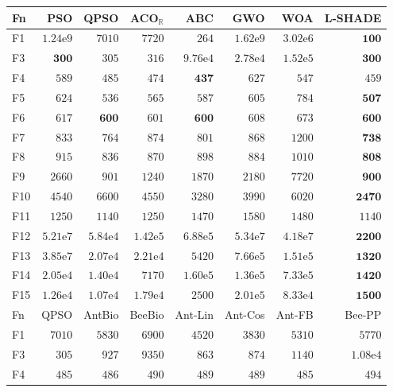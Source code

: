 \begin{tabular}{lrrrrrrr}
\toprule
Fn & PSO & QPSO & ACO$_\mathbb{R}$ & ABC & GWO & WOA & L-SHADE \\
\midrule
F1 & $1.24\mathrm{e}{9}$ & $7010$ & $7720$ & $264$ & $1.62\mathrm{e}{9}$ & $3.02\mathrm{e}{6}$ & $\mathbf{100}$ \\
F3 & $\mathbf{300}$ & $305$ & $316$ & $9.76\mathrm{e}{4}$ & $2.78\mathrm{e}{4}$ & $1.52\mathrm{e}{5}$ & $\mathbf{300}$ \\
F4 & $589$ & $485$ & $474$ & $\mathbf{437}$ & $627$ & $547$ & $459$ \\
F5 & $624$ & $536$ & $565$ & $587$ & $605$ & $784$ & $\mathbf{507}$ \\
F6 & $617$ & $\mathbf{600}$ & $601$ & $\mathbf{600}$ & $608$ & $673$ & $\mathbf{600}$ \\
F7 & $833$ & $764$ & $874$ & $801$ & $868$ & $1200$ & $\mathbf{738}$ \\
F8 & $915$ & $836$ & $870$ & $898$ & $884$ & $1010$ & $\mathbf{808}$ \\
F9 & $2660$ & $901$ & $1240$ & $1870$ & $2180$ & $7720$ & $\mathbf{900}$ \\
F10 & $4540$ & $6600$ & $4550$ & $3280$ & $3990$ & $6020$ & $\mathbf{2470}$ \\
F11 & $1250$ & $1140$ & $1250$ & $1470$ & $1580$ & $1480$ & $1140$ \\
F12 & $5.21\mathrm{e}{7}$ & $5.84\mathrm{e}{4}$ & $1.42\mathrm{e}{5}$ & $6.88\mathrm{e}{5}$ & $5.34\mathrm{e}{7}$ & $4.18\mathrm{e}{7}$ & $\mathbf{2200}$ \\
F13 & $3.85\mathrm{e}{7}$ & $2.07\mathrm{e}{4}$ & $2.21\mathrm{e}{4}$ & $5420$ & $7.66\mathrm{e}{5}$ & $1.51\mathrm{e}{5}$ & $\mathbf{1320}$ \\
F14 & $2.05\mathrm{e}{4}$ & $1.40\mathrm{e}{4}$ & $7170$ & $1.60\mathrm{e}{5}$ & $1.36\mathrm{e}{5}$ & $7.33\mathrm{e}{5}$ & $\mathbf{1420}$ \\
F15 & $1.26\mathrm{e}{4}$ & $1.07\mathrm{e}{4}$ & $1.79\mathrm{e}{4}$ & $2500$ & $2.01\mathrm{e}{5}$ & $8.33\mathrm{e}{4}$ & $\mathbf{1500}$ \\
\midrule
Fn & QPSO & AntBio & BeeBio & Ant-Lin & Ant-Cos & Ant-FB & Bee-PP \\
\midrule
F1 & $7010$ & $5830$ & $6900$ & $4520$ & $3830$ & $5310$ & $5770$ \\
F3 & $305$ & $927$ & $9350$ & $863$ & $874$ & $1140$ & $1.08\mathrm{e}{4}$ \\
F4 & $485$ & $486$ & $490$ & $489$ & $489$ & $485$ & $494$ \\

\end{tabular}
